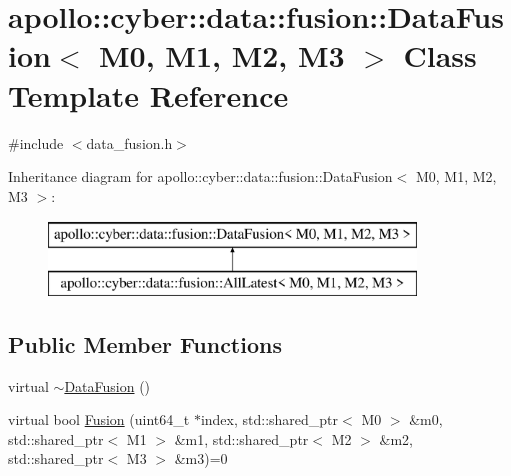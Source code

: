 \hypertarget{classapollo_1_1cyber_1_1data_1_1fusion_1_1DataFusion}{\section{apollo\-:\-:cyber\-:\-:data\-:\-:fusion\-:\-:Data\-Fusion$<$ M0, M1, M2, M3 $>$ Class Template Reference}
\label{classapollo_1_1cyber_1_1data_1_1fusion_1_1DataFusion}
}


{\ttfamily \#include $<$data\-\_\-fusion.\-h$>$}

Inheritance diagram for apollo\-:\-:cyber\-:\-:data\-:\-:fusion\-:\-:Data\-Fusion$<$ M0, M1, M2, M3 $>$\-:\begin{figure}[H]
\begin{center}
\leavevmode
\includegraphics[height=2.000000cm]{classapollo_1_1cyber_1_1data_1_1fusion_1_1DataFusion}
\end{center}
\end{figure}
\subsection*{Public Member Functions}
\begin{DoxyCompactItemize}
\item 
virtual \hyperlink{classapollo_1_1cyber_1_1data_1_1fusion_1_1DataFusion_a8d7a7673ce90ccd8ab5a5c550c84029e}{$\sim$\-Data\-Fusion} ()
\item 
virtual bool \hyperlink{classapollo_1_1cyber_1_1data_1_1fusion_1_1DataFusion_af992dd51063725886f3dce401ae08cbf}{Fusion} (uint64\-\_\-t $\ast$index, std\-::shared\-\_\-ptr$<$ M0 $>$ \&m0, std\-::shared\-\_\-ptr$<$ M1 $>$ \&m1, std\-::shared\-\_\-ptr$<$ M2 $>$ \&m2, std\-::shared\-\_\-ptr$<$ M3 $>$ \&m3)=0
\end{DoxyCompactItemize}


